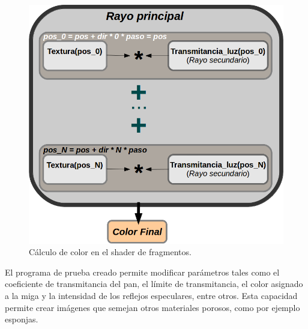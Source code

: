 \begin{figure}[htb!]
  \centerline{\includegraphics[width=13cm]{fragmentshader}}
  \caption{Cálculo de color en el shader de fragmentos. }
  \label{fg:fragmentshader}
\end{figure}


El programa de prueba creado permite modificar parámetros tales como el coeficiente de transmitancia del pan, el límite de transmitancia, el color asignado a la miga y la intensidad de los reflejos especulares, entre otros. Esta capacidad permite crear imágenes que semejan otros
materiales porosos, como por ejemplo esponjas.




